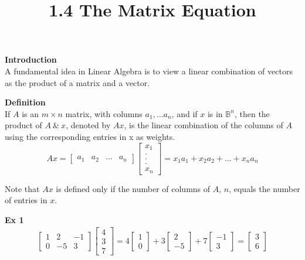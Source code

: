 \documentclass{article}
\title{1.4 The Matrix Equation}
\begin{document}
  \maketitle
  \textbf{Introduction}\\
  A fundamental idea in Linear Algebra is to view a linear combination of vectors as the product of a matrix and a vector.

  \textbf{Definition}\\
  If $ A $ is an $ m \times n $ matrix, with columns $ a_{1},...a_{n} $, and if $ x $ is in $ \mathbb{B}^{n}$, then the product of $ A ~\&~ x $, denoted by $ Ax $, is the linear combination of the columns of $ A $ using the corresponding entries in x as weights.
  \[
    Ax=\begin{bmatrix}
      a_{1} &a_{2} &... &a_{n} 
    \end{bmatrix} \begin{bmatrix}
      x_{1}\\
      .\\
      .\\
      .\\
      x_{n}
    \end{bmatrix} = x_{1}a_{1} + x_{2}a_{2} + ...+x_{n} a_{n}    
  \]

  Note that $ Ax $ is defined only if the number of columns of $ A $, $ n $, equals the number of entries in $ x $.
  
  \textbf{Ex 1}
  \[
    \begin{gathered}
    \begin{bmatrix}
      1 &2 &-1\\
      0 &-5 &3
    \end{bmatrix}
    \begin{bmatrix}
      4\\
      3\\
      7
    \end{bmatrix} = 
    4\begin{bmatrix}
      1\\
      0
    \end{bmatrix} +
    3\begin{bmatrix}
      2\\
      -5
    \end{bmatrix} +
    7 \begin{bmatrix}
      -1\\
      3
    \end{bmatrix} =
    \begin{bmatrix}
      3\\
      6
    \end{bmatrix}
    \end{gathered}
  \]
\end{document}
